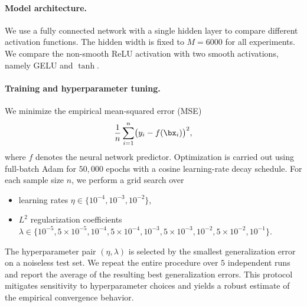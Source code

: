 \documentclass[11pt]{article}
\begin{document}
\paragraph{Model architecture.}
We use a fully connected network with a single hidden layer to compare different activation functions. The hidden width is fixed to $M=6000$ for all experiments. We compare the non-smooth ReLU activation with two smooth activations, namely GELU and $\tanh$.



\paragraph{Training and hyperparameter tuning.}
We minimize the empirical mean-squared error (MSE)
\[
\frac{1}{n}\sum_{i=1}^{n}\bigl(y_i - f(\bx_i)\bigr)^2,
\]
where $f$ denotes the neural network predictor. Optimization is carried out using full-batch Adam for $50{,}000$ epochs with a cosine learning-rate decay schedule. For each sample size $n$, we perform a grid search over
\begin{itemize}
    \item learning rates $\eta \in \{10^{-4},10^{-3},10^{-2}\}$,
    \item $L^2$ regularization coefficients $\lambda \in \{10^{-5}, 5\times 10^{-5}, 10^{-4}, 5\times 10^{-4}, 10^{-3}, 5\times 10^{-3}, 10^{-2}, 5\times 10^{-2}, 10^{-1}\}$.
\end{itemize}
The hyperparameter pair $(\eta,\lambda)$ is selected by the smallest generalization error on a noiseless test set. We repeat the entire procedure over $5$ independent runs and report the average of the resulting best generalization errors. This protocol mitigates sensitivity to hyperparameter choices and yields a robust estimate of the empirical convergence behavior.
\end{document}
